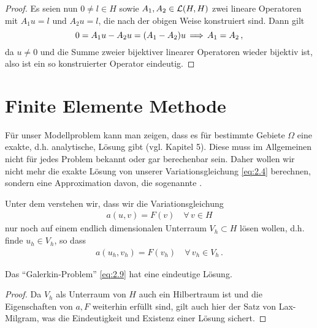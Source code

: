 \begin{proof}
Es seien nun $0 \not = l\in H$ sowie $A_1,A_2 \in \mathcal L(H,H)$ zwei lineare Operatoren mit $A_1u = l$ und $A_2 u = l$, die nach der obigen Weise konstruiert sind. Dann gilt
\[
	0 = A_1 u - A_2 u = (A_1 - A_2)u \, \Longrightarrow \, A_1 = A_2 \, , 
\]
da $u \not = 0$ und die Summe zweier bijektiver linearer Operatoren wieder bijektiv ist, also ist ein so konstruierter Operator eindeutig.
\end{proof}






\section{Finite Elemente Methode}
\label{kap:2.3}


Für unser Modellproblem kann man zeigen, dass es für bestimmte Gebiete $\Omega$ eine exakte, d.h. analytische, Lösung gibt (vgl. \cite{Walker} Kapitel 5). Diese muss im Allgemeinen nicht für jedes Problem bekannt oder gar berechenbar sein. Daher wollen wir nicht mehr die exakte Lösung von unserer Variationsgleichung \eqref{eq:2.4} berechnen, sondern eine Approximation davon, die sogenannte \textit{}.

Unter dem \textit{} verstehen wir, dass wir die Variationsgleichung
\begin{align}\label{eq:2.8}
	a(u,v) = F(v) \quad \forall \, v \in H
\end{align}
nur noch auf einem endlich dimensionalen Unterraum $V_h \subset H$ lösen wollen, d.h. finde $u_h \in V_h$, so dass
\begin{align}\label{eq:2.9}
	a(u_h,v_h) = F(v_h) \quad \forall \, v_h \in V_h \, .
\end{align}


\begin{satz}\label{satz:2.17}
Das "`Galerkin-Problem"' \eqref{eq:2.9} hat eine eindeutige Lösung.
\end{satz}

\begin{proof}
Da $V_h$ als Unterraum von $H$ auch ein Hilbertraum ist und die Eigenschaften von $a, F$ weiterhin erfüllt sind, gilt auch hier der Satz von Lax-Milgram, was die Eindeutigkeit und Existenz einer Lösung sichert.
\end{proof}


